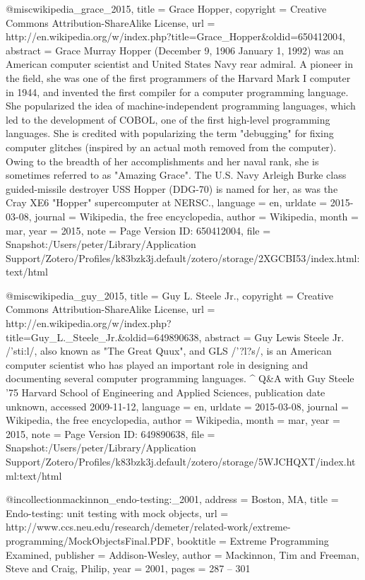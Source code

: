 {@misc{wikipedia_grace_2015,
	title = {Grace {Hopper}},
	copyright = {Creative Commons Attribution-ShareAlike License},
	url = {http://en.wikipedia.org/w/index.php?title=Grace_Hopper&oldid=650412004},
	abstract = {Grace Murray Hopper (December 9, 1906 {\textendash} January 1, 1992) was an American computer scientist and United States Navy rear admiral. A pioneer in the field, she was one of the first programmers of the Harvard Mark I computer in 1944, and invented the first compiler for a computer programming language. She popularized the idea of machine-independent programming languages, which led to the development of COBOL, one of the first high-level programming languages. She is credited with popularizing the term "debugging" for fixing computer glitches (inspired by an actual moth removed from the computer). Owing to the breadth of her accomplishments and her naval rank, she is sometimes referred to as "Amazing Grace". The U.S. Navy Arleigh Burke class guided-missile destroyer USS Hopper (DDG-70) is named for her, as was the Cray XE6 "Hopper" supercomputer at NERSC.},
	language = {en},
	urldate = {2015-03-08},
	journal = {Wikipedia, the free encyclopedia},
	author = {{Wikipedia}},
	month = mar,
	year = {2015},
	note = {Page Version ID: 650412004},
	file = {Snapshot:/Users/peter/Library/Application Support/Zotero/Profiles/k83bzk3j.default/zotero/storage/2XGCBI53/index.html:text/html}
}

@misc{wikipedia_guy_2015,
	title = {Guy {L}. {Steele} {Jr}.},
	copyright = {Creative Commons Attribution-ShareAlike License},
	url = {http://en.wikipedia.org/w/index.php?title=Guy_L._Steele_Jr.&oldid=649890638},
	abstract = {Guy Lewis Steele Jr. /'sti:l/, also known as "The Great Quux", and GLS /'?l?s/, is an American computer scientist who has played an important role in designing and documenting several computer programming languages.
{\textasciicircum} Q\&A with Guy Steele '75 Harvard School of Engineering and Applied Sciences, publication date unknown, accessed 2009-11-12},
	language = {en},
	urldate = {2015-03-08},
	journal = {Wikipedia, the free encyclopedia},
	author = {{Wikipedia}},
	month = mar,
	year = {2015},
	note = {Page Version ID: 649890638},
	file = {Snapshot:/Users/peter/Library/Application Support/Zotero/Profiles/k83bzk3j.default/zotero/storage/5WJCHQXT/index.html:text/html}
}

@incollection{mackinnon_endo-testing:_2001,
	address = {Boston, MA},
	title = {Endo-testing: unit testing with mock objects},
	url = {http://www.ccs.neu.edu/research/demeter/related-work/extreme-programming/MockObjectsFinal.PDF},
	booktitle = {Extreme {Programming} {Examined}},
	publisher = {Addison-Wesley},
	author = {Mackinnon, Tim and Freeman, Steve and Craig, Philip},
	year = {2001},
	pages = {287 -- 301}
}

}
